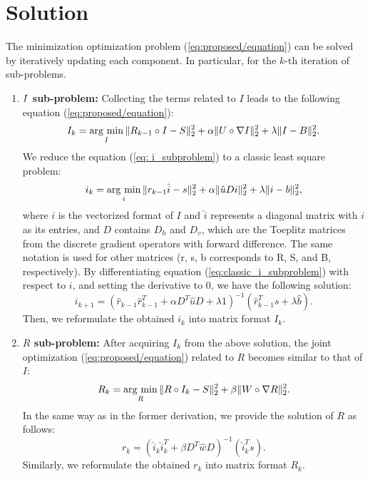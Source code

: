 \section{Solution} \label{sec:solution}
The minimization optimization problem (\ref{eq:proposed/equation}) can be solved by iteratively updating each component. In particular, for the $k$-th iteration of sub-problems.
\begin{enumerate}
\renewcommand{\labelenumi}{\arabic{enumi}).}
\item \textbf{$\boldmath{I}$ sub-problem:} Collecting the terms related to $I$ leads to the following equation (\ref{eq:proposed/equation}):
\begin{equation}
I_{k} = \mathop{\rm arg~min}\limits_{I}\|R_{k-1} \circ I - S\|_{2}^{2} + \alpha\|U \circ \nabla{I}\|_{2}^{2} 
+\lambda \|I - B\|_{2}^{2}. \label{eq: i_subproblem}
\end{equation}
We reduce the equation (\ref{eq: i_subproblem}) to a classic least square problem:
\begin{equation}
i_{k} = \mathop{\rm arg~min}\limits_{i} \|r_{k-1} \hat{i} - s\|_{2}^{2} + \alpha\|\hat{u}Di\|_{2}^{2} + \lambda \|i - b\|_{2}^{2}, \label{eq:classic_i_subproblem}
\end{equation}
where $i$ is the vectorized format of $I$ and $\hat{i}$ represents a diagonal matrix with $i$ as its entries, and $D$ contains $D_{h}$ and $D_{v}$, which are the Toeplitz matrices from the discrete gradient operators with forward difference.
The same notation is used for other matrices (r, s, b corresponds to R, S, and B, respectively). By differentiating equation (\ref{eq:classic_i_subproblem}) with respect to $i$, and setting the derivative to $0$, we have the following solution:
\begin{equation}
i_{k+1} = (\hat{r}_{k-1}\hat{r}_{k-1}^{T} + \alpha D^{T}\hat{u}D + \lambda{1})^{-1} (\hat{r}_{k-1}^{T}s + \lambda{\hat{b}}). \label{eq: i_solution}
\end{equation}
Then, we reformulate the obtained $i_{k}$ into matrix format $I_{k}$.
\item \textbf{$R$ sub-problem:} After acquiring $I_{k}$ from the above solution, the joint optimization (\ref{eq:proposed/equation}) related to $R$ becomes similar to that of $I$:
\begin{equation}
R_{k} = \mathop{\rm arg~min}\limits_{R}\|R \circ I_{k} - S\|_{2}^{2} + \beta\|W \circ \nabla{R}\|_{2}^{2}. \label{eq: r_subproblem}
\end{equation}
In the same way as in the former derivation, we provide the solution of $R$ as follows:
\begin{equation}
r_{k} = (\hat{i}_{k}\hat{i}_{k}^{T} + \beta D^{T}\hat{w}D)^{-1} (\hat{i}_{k}^{T}s). \label{eq: solution_r_subproblem}
\end{equation}
Similarly, we reformulate the obtained $r_{k}$ into matrix format $R_{k}$.
\end{enumerate}
